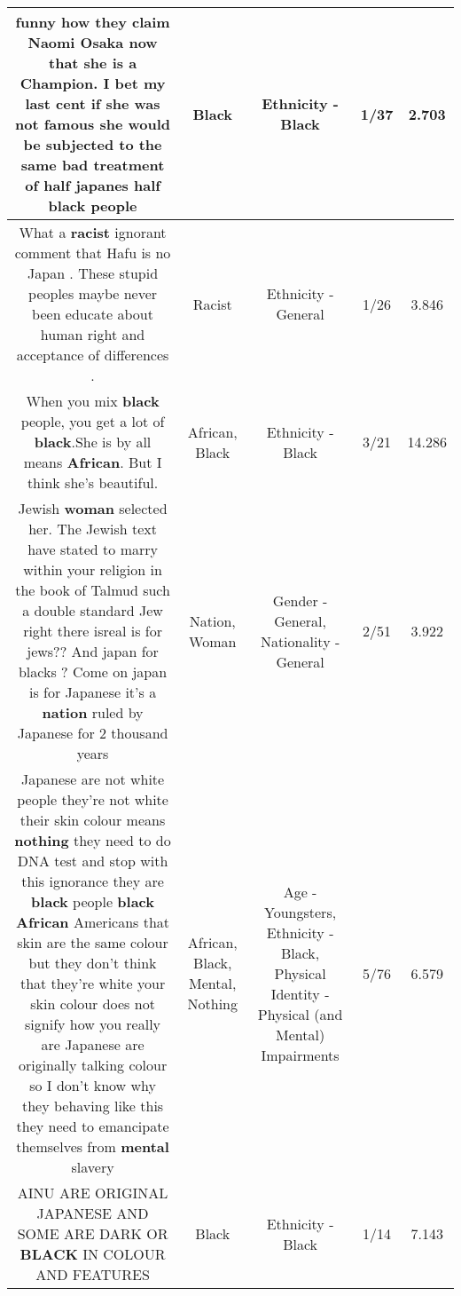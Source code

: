 \documentclass[11pt]{article}
\newlength\mylength
\begin{document}
\begin{center}
\begin{longtable}{|C{.65\mylength}|C{.30\mylength}|C{.12\mylength}|C{.12\mylength}|C{.12\mylength}|}
  \small funny how they claim Naomi Osaka now that she is a Champion. I bet my last cent if she was not famous she would be subjected to the same bad treatment of half japanes half \textbf{black} people\normalsize   & Black & Ethnicity - Black & 1/37 & 2.703 \\  \hline
  \small What a \textbf{racist} ignorant comment that Hafu is no Japan . These stupid peoples maybe never been educate about human right and acceptance of differences .\normalsize   & Racist & Ethnicity - General & 1/26 & 3.846 \\  \hline
  \small When you mix \textbf{black} people, you get a lot of \textbf{black}.She is by all means \textbf{African}. But I think she's beautiful.\normalsize   & African, Black & Ethnicity - Black & 3/21 & 14.286 \\  \hline
  \small Jewish \textbf{woman} selected her. The Jewish text have stated to marry within your religion in the book of Talmud such a double standard Jew right there isreal is for jews?? And japan for blacks ? Come on japan is for Japanese it's a \textbf{nation} ruled by Japanese for 2 thousand years\normalsize   & Nation, Woman & Gender - General, Nationality - General & 2/51 & 3.922 \\  \hline
  \small Japanese are not white people they're not white their skin colour means \textbf{nothing} they need to do DNA test and stop with this ignorance they are \textbf{black} people \textbf{black} \textbf{African} Americans that skin are the same colour but they don't think that they're white your skin colour does not signify how you really are Japanese are originally talking colour so I don't know why they behaving like this they need to emancipate themselves from \textbf{mental} slavery\normalsize   & African, Black, Mental, Nothing & Age - Youngsters, Ethnicity - Black, Physical Identity - Physical (and Mental) Impairments & 5/76 & 6.579 \\  \hline
  \small AINU ARE ORIGINAL JAPANESE AND SOME ARE DARK OR \textbf{BLACK} IN COLOUR AND FEATURES\normalsize   & Black & Ethnicity - Black & 1/14 & 7.143 \\  \hline

\end{longtable}
\end{center}
\end{document}
